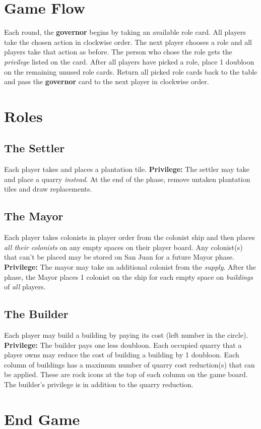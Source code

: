 \documentclass[12pt]{article}
\begin{document}
\begin{mdframed}[style = customFrame]
\begin{multicols*}{2}
\section*{Game Flow}
Each round, the \textbf{governor} begins by taking an available role card. All players take the chosen action in clockwise order. The next player chooses a role and all players take that action as before. The person who chose the role gets the \emph{privilege} listed on the card. After all players have picked a role, place 1 doubloon on the remaining unused role cards. Return all picked role cards back to the table and pass the \textbf{governor} card to the next player in clockwise order.

\section*{Roles}
\subsection*{The Settler}
Each player takes and places a plantation tile. \textbf{Privilege:} The settler may take and place a quarry \emph{instead}. At the end of the phase, remove untaken plantation tiles and draw replacements.

\subsection*{The Mayor}
Each player takes colonists in player order from the colonist ship and then places \emph{all their colonists} on any empty spaces on their player board. Any colonist(s) that can't be placed may be stored on San Juan for a future Mayor phase. \textbf{Privilege:} The mayor may take an additional colonist from the \emph{supply}. After the phase, the Mayor places 1 colonist on the ship for each empty space on \emph{buildings} of \emph{all} players.

\subsection*{The Builder}
Each player may build a building by paying its cost (left number in the circle). \textbf{Privilege:} The builder pays one less doubloon. Each occupied quarry that a player owns may reduce the cost of building a building by 1 doubloon. Each column of buildings has a maximum number of quarry cost reduction(s) that can be applied. These are rock icons at the top of each column on the game board. The builder's privilege is in addition to the quarry reduction.

\section*{End Game}

\end{multicols*}
\end{mdframed}
\end{document}

